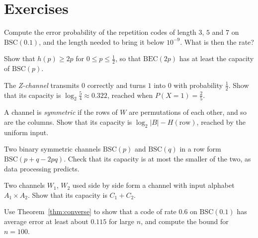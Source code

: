 \section{Exercises}

\begin{exercise}[$\star$]\label{ex:repetition}
Compute the error probability of the repetition codes of length $3$, $5$ and $7$ on $\mathrm{BSC}(0.1)$, and the length needed to bring it below $10^{-9}$. What is then the rate?
\end{exercise}

\begin{exercise}[$\star$]\label{ex:erasureerror}
Show that $h(p)\ge2p$ for $0\le p\le\frac12$, so that $\mathrm{BEC}(2p)$ has at least the capacity of $\mathrm{BSC}(p)$.
\end{exercise}

\begin{exercise}[$\star\star$]\label{ex:zchannel}
The \emph{Z-channel} transmits $0$ correctly and turns $1$ into $0$ with probability $\frac12$. Show that its capacity is $\log_2\frac54\approx0.322$, reached when $P(X=1)=\frac25$.
\end{exercise}

\begin{exercise}[$\star\star$]\label{ex:symmetric}
A channel is \emph{symmetric} if the rows of $W$ are permutations of each other, and so are the columns. Show that its capacity is $\log_2|B|-H(\text{row})$, reached by the uniform input.
\end{exercise}

\begin{exercise}[$\star$]\label{ex:cascade}
Two binary symmetric channels $\mathrm{BSC}(p)$ and $\mathrm{BSC}(q)$ in a row form $\mathrm{BSC}(p+q-2pq)$. Check that its capacity is at most the smaller of the two, as data processing predicts.
\end{exercise}

\begin{exercise}[$\star\star$]\label{ex:parallel}
Two channels $W_1$, $W_2$ used side by side form a channel with input alphabet $A_1\times A_2$. Show that its capacity is $C_1+C_2$.
\end{exercise}

\begin{exercise}[$\star$]\label{ex:fanobound}
Use Theorem~\ref{thm:converse} to show that a code of rate $0.6$ on $\mathrm{BSC}(0.1)$ has average error at least about $0.115$ for large $n$, and compute the bound for $n=100$.
\end{exercise}

